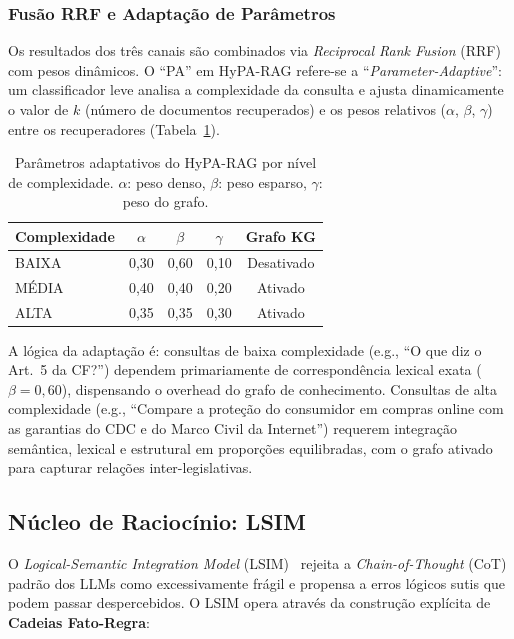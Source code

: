 \documentclass[journal,10pt]{IEEEtran}
\begin{document}
\subsubsection{Fus\~{a}o RRF e Adapta\c{c}\~{a}o de Par\^{a}metros}
Os resultados dos tr\^{e}s canais s\~{a}o combinados via \textit{Reciprocal Rank Fusion} (RRF) com pesos din\^{a}micos. O ``PA'' em HyPA-RAG refere-se a ``\textit{Parameter-Adaptive}'': um classificador leve analisa a complexidade da consulta e ajusta dinamicamente o valor de $k$ (n\'{u}mero de documentos recuperados) e os pesos relativos ($\alpha$, $\beta$, $\gamma$) entre os recuperadores (Tabela~\ref{tab:hyparag}).

\begin{table}[!t]
\centering
\caption{Par\^{a}metros adaptativos do HyPA-RAG por n\'{i}vel de complexidade. $\alpha$: peso denso, $\beta$: peso esparso, $\gamma$: peso do grafo.}
\label{tab:hyparag}
\small
\begin{tabular}{lcccc}
\toprule
\textbf{Complexidade} & $\alpha$ & $\beta$ & $\gamma$ & \textbf{Grafo KG} \\
\midrule
BAIXA  & 0,30 & 0,60 & 0,10 & Desativado \\
M\'{E}DIA & 0,40 & 0,40 & 0,20 & Ativado \\
ALTA   & 0,35 & 0,35 & 0,30 & Ativado \\
\bottomrule
\end{tabular}
\end{table}

A l\'{o}gica da adapta\c{c}\~{a}o \'{e}: consultas de baixa complexidade (e.g., ``O que diz o Art.~5\textordmasculine{} da CF?'') dependem primariamente de correspond\^{e}ncia lexical exata ($\beta = 0{,}60$), dispensando o overhead do grafo de conhecimento. Consultas de alta complexidade (e.g., ``Compare a prote\c{c}\~{a}o do consumidor em compras online com as garantias do CDC e do Marco Civil da Internet'') requerem integra\c{c}\~{a}o sem\^{a}ntica, lexical e estrutural em propor\c{c}\~{o}es equilibradas, com o grafo ativado para capturar rela\c{c}\~{o}es inter-legislativas.

\subsection{N\'{u}cleo de Racioc\'{i}nio: LSIM}

O \textit{Logical-Semantic Integration Model} (LSIM)~\cite{niklaus2025a} rejeita a \textit{Chain-of-Thought} (CoT) padr\~{a}o dos LLMs como excessivamente fr\'{a}gil e propensa a erros l\'{o}gicos sutis que podem passar despercebidos. O LSIM opera atrav\'{e}s da constru\c{c}\~{a}o expl\'{i}cita de \textbf{Cadeias Fato-Regra}:
\end{document}
